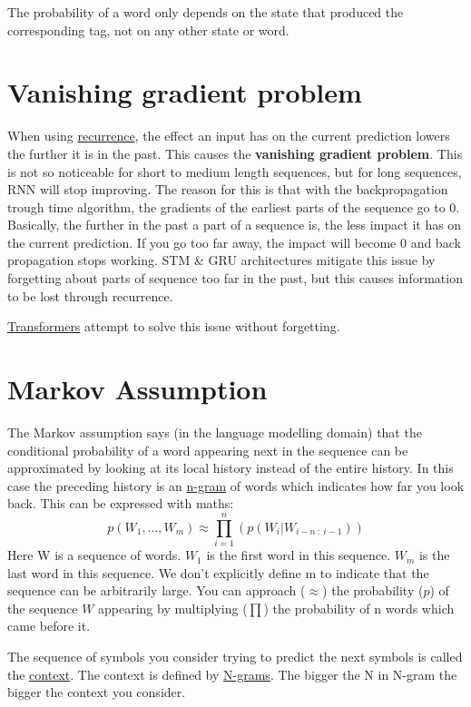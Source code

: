 \documentclass[
  11pt,
  british,
]{article}
\begin{document}
The probability of a word only depends on the state that produced the
corresponding tag, not on any other state or word.

\hypertarget{vanishing-gradient-problem}{%
\section{Vanishing gradient problem}\label{vanishing-gradient-problem}}

When using \href{Recurrence.md}{recurrence}, the effect an input has on
the current prediction lowers the further it is in the past. This causes
the \textbf{vanishing gradient problem}. This is not so noticeable for
short to medium length sequences, but for long sequences, RNN will stop
improving. The reason for this is that with the backpropagation trough
time algorithm, the gradients of the earliest parts of the sequence go
to 0. Basically, the further in the past a part of a sequence is, the
less impact it has on the current prediction. If you go too far away,
the impact will become 0 and back propagation stops working. STM \& GRU
architectures mitigate this issue by forgetting about parts of sequence
too far in the past, but this causes information to be lost through
recurrence.

\href{Transformers.md}{Transformers} attempt to solve this issue without
forgetting.

\hypertarget{markov-assumption-1}{%
\section{Markov Assumption}\label{markov-assumption-1}}

The Markov assumption says (in the language modelling domain) that the
conditional probability of a word appearing next in the sequence can be
approximated by looking at its local history instead of the entire
history. In this case the preceding history is an
\href{../Languages/N-grams.md}{n-gram} of words which indicates how far
you look back. This can be expressed with maths:
\[p(W_{1},...,W_{m}) \approx \prod^{n}_{i = 1}(p(W_{i}|W_{i-n~:~i-1}))\]
Here W is a sequence of words. \(W_1\) is the first word in this
sequence. \(W_m\) is the last word in this sequence. We don't explicitly
define m to indicate that the sequence can be arbitrarily large. You can
approach (\(\approx\)) the probability (\(p\)) of the sequence \(W\)
appearing by multiplying (\(\prod\)) the probability of n words which
came before it.

The sequence of symbols you consider trying to predict the next symbols
is called the \href{../Semantic-Similarity/Context.md}{context}. The
context is defined by \href{../Languages/N-grams.md}{N-grams}. The
bigger the N in N-gram the bigger the context you consider.
\end{document}
